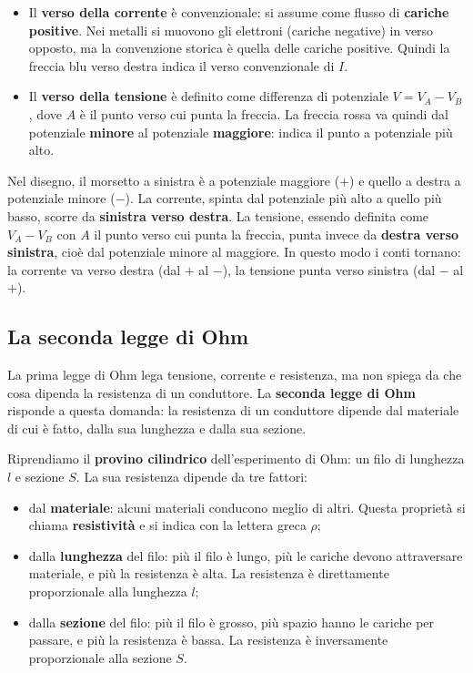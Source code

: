 \begin{itemize}[leftmargin=0.5cm]
  \item Il \textbf{verso della corrente} è convenzionale: si assume come flusso di \textbf{cariche positive}. Nei metalli si muovono gli elettroni (cariche negative) in verso opposto, ma la convenzione storica è quella delle cariche positive. Quindi la freccia blu verso destra indica il verso convenzionale di \(I\).
  \item Il \textbf{verso della tensione} è definito come differenza di potenziale \(V = V_A - V_B\), dove \(A\) è il punto verso cui punta la freccia. La freccia rossa va quindi dal potenziale \textbf{minore} al potenziale \textbf{maggiore}: indica il punto a potenziale più alto.
\end{itemize}

Nel disegno, il morsetto a sinistra è a potenziale maggiore (\(+\)) e quello a destra a potenziale minore (\(-\)). La corrente, spinta dal potenziale più alto a quello più basso, scorre da \textbf{sinistra verso destra}. La tensione, essendo definita come \(V_A - V_B\) con \(A\) il punto verso cui punta la freccia, punta invece da \textbf{destra verso sinistra}, cioè dal potenziale minore al maggiore. In questo modo i conti tornano: la corrente va verso destra (dal \(+\) al \(-\)), la tensione punta verso sinistra (dal \(-\) al \(+\)).


















\subsection{La seconda legge di Ohm}

La prima legge di Ohm lega tensione, corrente e resistenza, ma non spiega da che cosa dipenda la resistenza di un conduttore. La \textbf{seconda legge di Ohm} risponde a questa domanda: la resistenza di un conduttore dipende dal materiale di cui è fatto, dalla sua lunghezza e dalla sua sezione.

Riprendiamo il \textbf{provino cilindrico} dell'esperimento di Ohm: un filo di lunghezza \(l\) e sezione \(S\). La sua resistenza dipende da tre fattori:
\begin{itemize}[leftmargin=1cm]
  \item dal \textbf{materiale}: alcuni materiali conducono meglio di altri. Questa proprietà si chiama \textbf{resistività} e si indica con la lettera greca \(\rho\);
  \item dalla \textbf{lunghezza} del filo: più il filo è lungo, più le cariche devono attraversare materiale, e più la resistenza è alta. La resistenza è direttamente proporzionale alla lunghezza \(l\);
  \item dalla \textbf{sezione} del filo: più il filo è grosso, più spazio hanno le cariche per passare, e più la resistenza è bassa. La resistenza è inversamente proporzionale alla sezione \(S\).
\end{itemize}

